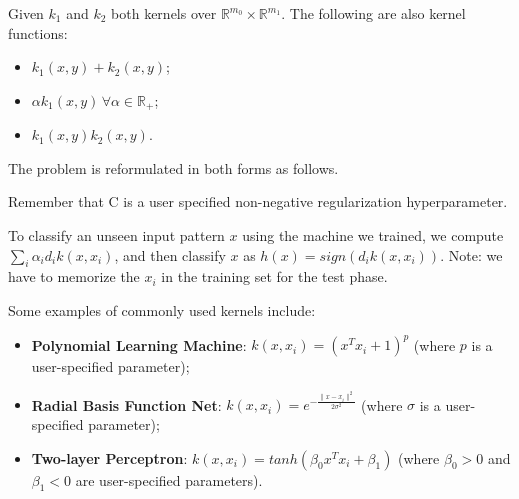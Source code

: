 Given $k_1$ and $k_2$ both kernels over $\mathbb{R}^{m_0} \times \mathbb{R}^{m_1}$. The following are also kernel functions:
\begin{itemize}
    \item $k_1(x,y) + k_2(x,y)$;
    \item $\alpha k_1(x,y) \, \forall \alpha \in \mathbb{R}_+$;
    \item $k_1(x,y)k_2(x,y)$.
\end{itemize}

The problem is reformulated in both forms as follows.


Remember that C is a user specified non-negative  regularization hyperparameter.

To classify an unseen input pattern $x$ using the machine we trained, we compute $\sum_i \alpha_i d_i k(x, x_i)$, and then classify $x$ as $h(x) = sign(d_i k(x, x_i))$. Note: we have to memorize the $x_i$ in the training set for the test phase.

Some examples of commonly used kernels include:
\begin{itemize}
    \item \textbf{Polynomial Learning Machine}: $k(x,x_i) = (x^T x_i + 1)^p$ (where $p$ is a user-specified parameter);
    \item \textbf{Radial Basis Function Net}: $k(x, x_i) = e^{-\frac{\|x - x_i\|^2}{2 \sigma^2}}$ (where $\sigma$ is a user-specified parameter);
    \item \textbf{Two-layer Perceptron}: $k(x,x_i) = tanh(\beta_0 x^T x_i + \beta_1)$ (where $\beta_0 > 0$ and $\beta_1 < 0$ are user-specified parameters).
\end{itemize}

